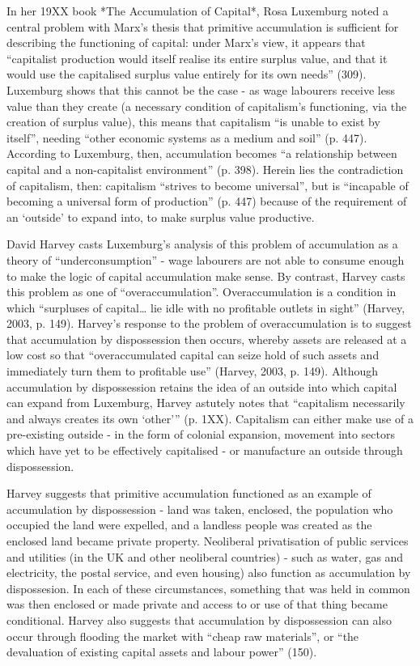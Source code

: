 In her 19XX book *The Accumulation of Capital*, Rosa Luxemburg noted a
central problem with Marx's thesis that primitive accumulation is
sufficient for describing the functioning of capital: under Marx's view,
it appears that ``capitalist production would itself realise its entire
surplus value, and that it would use the capitalised surplus value
entirely for its own needs'' (309). Luxemburg shows that this cannot be
the case - as wage labourers receive less value than they create (a
necessary condition of capitalism's functioning, via the creation of
surplus value), this means that capitalism ``is unable to exist by
itself'', needing ``other economic systems as a medium and soil'' (p.
447). According to Luxemburg, then, accumulation becomes ``a
relationship between capital and a non-capitalist environment'' (p.
398). Herein lies the contradiction of capitalism, then: capitalism
``strives to become universal'', but is ``incapable of becoming a
universal form of production'' (p. 447) because of the requirement of an
`outside' to expand into, to make surplus value productive.

David Harvey casts Luxemburg's analysis of this problem of accumulation
as a theory of ``underconsumption'' - wage labourers are not able to
consume enough to make the logic of capital accumulation make sense. By
contrast, Harvey casts this problem as one of ``overaccumulation''.
Overaccumulation is a condition in which ``surpluses of capital\ldots{}
lie idle with no profitable outlets in sight'' (Harvey, 2003, p. 149).
Harvey's response to the problem of overaccumulation is to suggest that
accumulation by dispossession then occurs, whereby assets are released
at a low cost so that ``overaccumulated capital can seize hold of such
assets and immediately turn them to profitable use'' (Harvey, 2003, p.
149). Although accumulation by dispossession retains the idea of an
outside into which capital can expand from Luxemburg, Harvey astutely
notes that ``capitalism necessarily and always creates its own `other'''
(p. 1XX). Capitalism can either make use of a pre-existing outside - in
the form of colonial expansion, movement into sectors which have yet to
be effectively capitalised - or manufacture an outside through
dispossession.

Harvey suggests that primitive accumulation functioned as an example of
accumulation by dispossession - land was taken, enclosed, the population
who occupied the land were expelled, and a landless people was created
as the enclosed land became private property. Neoliberal privatisation
of public services and utilities (in the UK and other neoliberal
countries) - such as water, gas and electricity, the postal service, and
even housing) also function as accumulation by dispossesion. In each of
these circumstances, something that was held in common was then enclosed
or made private and access to or use of that thing became conditional.
Harvey also suggests that accumulation by dispossession can also occur
through flooding the market with ``cheap raw materials'', or ``the
devaluation of existing capital assets and labour power'' (150).

